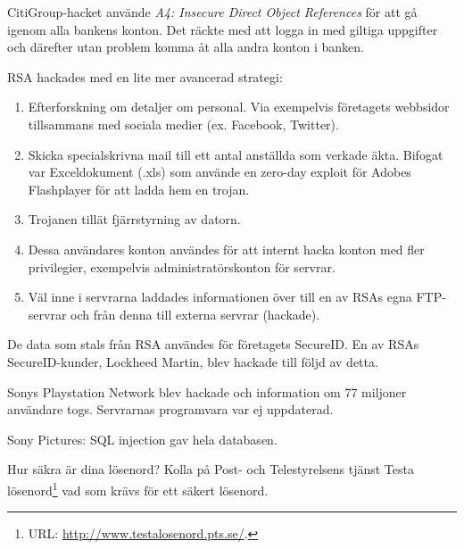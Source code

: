 \documentclass[11pt,a4paper]{miunasgn}
\begin{document}
\begin{questions}
	\begin{solution}
		CitiGroup-hacket använde \emph{A4: Insecure Direct Object References}
		för att gå igenom alla bankens konton.
		Det räckte med att logga in med giltiga uppgifter och därefter utan
		problem komma åt alla andra konton i banken.

		RSA hackades med en lite mer avancerad strategi:
		\begin{enumerate}
			\item Efterforskning om detaljer om personal.
				Via exempelvis företagets webbsidor tillsammans med sociala
				medier (ex. Facebook, Twitter).
			\item Skicka specialskrivna mail till ett antal anställda som
				verkade äkta.
				Bifogat var Exceldokument (.xls) som använde en zero-day
				exploit för Adobes Flashplayer för att ladda hem en trojan.
			\item Trojanen tillät fjärrstyrning av datorn.
			\item Dessa användares konton användes för att internt hacka konton
				med fler privilegier, exempelvis administratörskonton för
				servrar.
			\item Väl inne i servrarna laddades informationen över till en av
				RSAs egna FTP-servrar och från denna till externa servrar
				(hackade).
		\end{enumerate}
		De data som stals från RSA användes för företagets SecureID.
		En av RSAs SecureID-kunder, Lockheed Martin, blev hackade till följd av
		detta.

		Sonys Playstation Network blev hackade och information om 77 miljoner
		användare togs.
		Servrarnas programvara var ej uppdaterad.

		Sony Pictures: SQL injection gav hela databasen.
	\end{solution}

	\question\label{q:Losenord}
	Hur säkra är dina lösenord?
	Kolla på Post- och Telestyrelsens tjänst Testa lösenord\footnote{%
		URL: \url{http://www.testalosenord.pts.se/}.
	} vad som krävs för ett säkert lösenord.
\end{questions}
\end{document}
